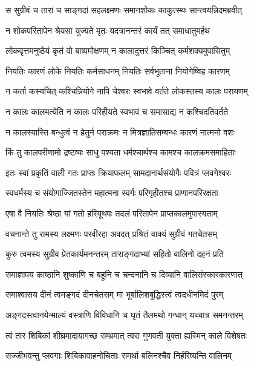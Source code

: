 
\twolineshloka
{स सुग्रीवं च तारां च साङ्गदां सहलक्ष्मणः}
{समानशोकः काकुत्स्थः सान्त्वयन्निदमब्रवीत्} %

\twolineshloka
{न शोकपरितापेन श्रेयसा युज्यते मृतः}
{यदत्रानन्तरं कार्यं तत् समाधातुमर्हथ} %

\twolineshloka
{लोकवृत्तमनुष्ठेयं कृतं वो बाष्पमोक्षणम्}
{न कालादुत्तरं किञ्चित् कर्मशक्यमुपासितुम्} %

\twolineshloka
{नियतिः कारणं लोके नियतिः कर्मसाधनम्}
{नियतिः सर्वभूतानां नियोगेष्विह कारणम्} %

\twolineshloka
{न कर्ता कस्यचित् कश्चिन्नियोगे नापि चेश्वरः}
{स्वभावे वर्तते लोकस्तस्य कालः परायणम्} %

\twolineshloka
{न कालः कालमत्येति न कालः परिहीयते}
{स्वभावं च समासाद्य न कश्चिदतिवर्तते} %

\twolineshloka
{न कालस्यास्ति बन्धुत्वं न हेतुर्न पराक्रमः}
{न मित्रज्ञातिसम्बन्धः कारणं नात्मनो वशः} %

\twolineshloka
{किं तु कालपरीणामो द्रष्टव्यः साधु पश्यता}
{धर्मश्चार्थश्च कामश्च कालक्रमसमाहिताः} %

\twolineshloka
{इतः स्वां प्रकृतिं वाली गतः प्राप्तः क्रियाफलम्}
{सामदानार्थसंयोगैः पवित्रं प्लवगेश्वरः} %

\twolineshloka
{स्वधर्मस्य च संयोगाज्जितस्तेन महात्मना}
{स्वर्गः परिगृहीतश्च प्राणानपरिरक्षता} %

\twolineshloka
{एषा वै नियतिः श्रेष्ठा यां गतो हरियूथपः}
{तदलं परितापेन प्राप्तकालमुपास्यताम्} %

\twolineshloka
{वचनान्ते तु रामस्य लक्ष्मणः परवीरहा}
{अवदत् प्रश्रितं वाक्यं सुग्रीवं गतचेतसम्} %

\twolineshloka
{कुरु त्वमस्य सुग्रीव प्रेतकार्यमनन्तरम्}
{ताराङ्गदाभ्यां सहितो वालिनो दहनं प्रति} %

\twolineshloka
{समाज्ञापय काष्ठानि शुष्काणि च बहूनि च}
{चन्दनानि च दिव्यानि वालिसंस्कारकारणात्} %

\twolineshloka
{समाश्वासय दीनं त्वमङ्गदं दीनचेतसम्}
{मा भूर्बालिशबुद्धिस्त्वं त्वदधीनमिदं पुरम्} %

\twolineshloka
{अङ्गदस्त्वानयेन्माल्यं वस्त्राणि विविधानि च}
{घृतं तैलमथो गन्धान् यच्चात्र समनन्तरम्} %

\twolineshloka
{त्वं तार शिबिकां शीघ्रमादायागच्छ सम्भ्रमात्}
{त्वरा गुणवती युक्ता ह्यस्मिन् काले विशेषतः} %

\twolineshloka
{सज्जीभवन्तु प्लवगाः शिबिकावाहनोचिताः}
{समर्था बलिनश्चैव निर्हरिष्यन्ति वालिनम्} %

